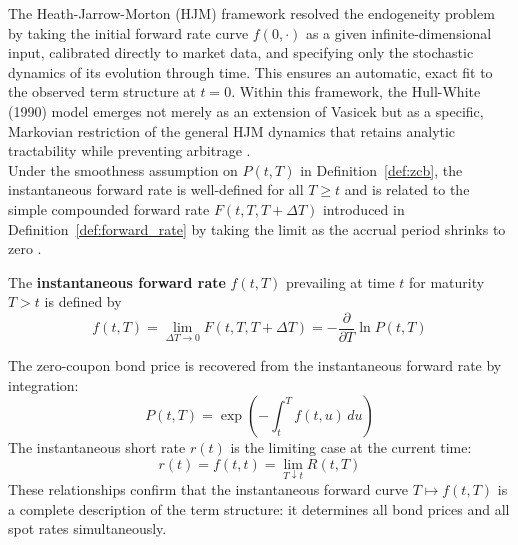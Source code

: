     \noindent
    The Heath-Jarrow-Morton (HJM) framework \cite{kwok2008mathematical} resolved the endogeneity problem by taking the initial forward rate curve $f(0,\cdot)$ as a given infinite-dimensional input, calibrated directly to market data, and specifying only the stochastic dynamics of its evolution through time. This ensures an automatic, exact fit to the observed term structure at $t = 0$. Within this framework, the Hull-White (1990) model emerges not merely as an extension of Vasicek but as a specific, Markovian restriction of the general HJM dynamics that retains analytic tractability while preventing arbitrage \cite{Green_2016}. \\

    \noindent
    Under the smoothness assumption on $P(t,T)$ in Definition~\ref{def:zcb}, the instantaneous forward rate is well-defined for all $T \geq t$ and is related to the simple compounded forward rate $F(t,T,T+\Delta T)$ introduced in Definition~\ref{def:forward_rate} by taking the limit as the accrual period shrinks to zero \cite{brigo2001interest}.

    \begin{definition} \label{def:inst_forward_rate}
    The \textbf{instantaneous forward rate} $f(t,T)$ prevailing at time $t$ for maturity $T > t$ is defined by
    \begin{equation}
        f(t,T) = \lim_{\Delta T \to 0} F(t,T,T+\Delta T) = -\frac{\partial}{\partial T} \ln P(t,T)
    \end{equation}
    \end{definition}

    \noindent
    The zero-coupon bond price is recovered from the instantaneous forward rate by integration:
    \begin{equation}
        P(t,T) = \exp\!\left(-\int_t^T f(t,u)\,du\right)
    \end{equation}
    The instantaneous short rate $r(t)$ is the limiting case at the current time:
    \begin{equation}
        r(t) = f(t,t) = \lim_{T \downarrow t} R(t,T)
    \end{equation}
    These relationships confirm that the instantaneous forward curve $T \mapsto f(t,T)$ is a complete description of the term structure: it determines all bond prices and all spot rates simultaneously. \\

